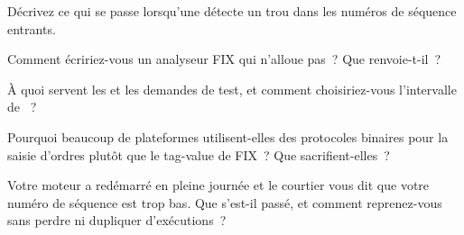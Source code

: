 \begin{interviewq}\label{iq:ll:protocols-i-fix:2}
Décrivez ce qui se passe lorsqu'une  détecte un trou dans les numéros de séquence entrants.
\end{interviewq}

\begin{interviewq}\label{iq:ll:protocols-i-fix:3}
Comment écririez-vous un analyseur FIX qui n'alloue pas~? Que renvoie-t-il~?
\end{interviewq}

\begin{interviewq}\label{iq:ll:protocols-i-fix:4}
À quoi servent les  et les demandes de test, et comment choisiriez-vous l'intervalle de ~?
\end{interviewq}

\begin{interviewq}\label{iq:ll:protocols-i-fix:5}
Pourquoi beaucoup de plateformes utilisent-elles des protocoles binaires pour la saisie d'ordres plutôt que le tag-value de FIX~? Que sacrifient-elles~?
\end{interviewq}

\begin{interviewq}\label{iq:ll:protocols-i-fix:6}
Votre moteur a redémarré en pleine journée et le courtier vous dit que votre numéro de séquence est trop bas. Que s'est-il passé, et comment
reprenez-vous sans perdre ni dupliquer d'exécutions~?
\end{interviewq}
